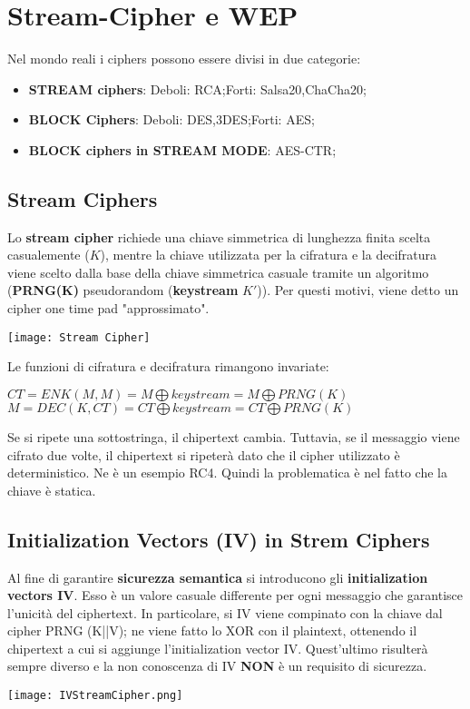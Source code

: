 \documentclass{article}
\theoremstyle{remark}
\begin{document}
\section{Stream-Cipher e WEP}
Nel mondo reali i ciphers possono essere divisi in due categorie:\begin{itemize}
    \item \textbf{STREAM ciphers}: \newline Deboli: RCA;\newline Forti: Salsa20,ChaCha20;
    \item \textbf{BLOCK Ciphers}: \newline Deboli: DES,3DES;\newline Forti: AES\@;
    \item \textbf{BLOCK ciphers in STREAM MODE}: \newline AES-CTR\@;
\end{itemize}
\subsection{Stream Ciphers}
Lo \textbf{stream cipher} richiede una chiave simmetrica di lunghezza finita scelta casualemente (\(K\)), mentre la chiave utilizzata per la cifratura e la decifratura viene scelto dalla base della chiave simmetrica casuale tramite un algoritmo (\textbf{PRNG(K)} pseudorandom (\textbf{keystream} $K'$)). Per questi motivi, viene detto un cipher one time pad "approssimato".
\begin{center}
    \texttt{[image: Stream Cipher]}
\end{center}
Le funzioni di cifratura e decifratura rimangono invariate:
\begin{center}
    \(CT= ENK(M,M)=M \bigoplus keystream = M \bigoplus PRNG(K)\)
    \(M = DEC(K,CT) = CT \bigoplus keystream = CT \bigoplus PRNG(K)\)
\end{center}
Se si ripete una sottostringa, il chipertext cambia. Tuttavia, se il messaggio viene cifrato due volte, il chipertext si ripeterà dato che il cipher utilizzato è deterministico. Ne è un esempio RC4.\newline
Quindi la problematica è nel fatto che la chiave è statica.
\subsection{Initialization Vectors (IV) in Strem Ciphers}
Al fine di garantire \textbf{sicurezza semantica} si introducono gli \textbf{initialization vectors IV}. Esso è un valore casuale differente per ogni messaggio che garantisce l'unicità del ciphertext. 
In particolare, si IV viene compinato con la chiave dal cipher PRNG (K||V); ne viene fatto lo XOR con il plaintext, ottenendo il chipertext a cui si aggiunge l'initialization vector IV. Quest'ultimo risulterà sempre diverso e la non conoscenza di IV \textbf{NON} è un requisito di sicurezza.
\begin{center}
    \texttt{[image: IVStreamCipher.png]}
\end{center}
\end{document}
